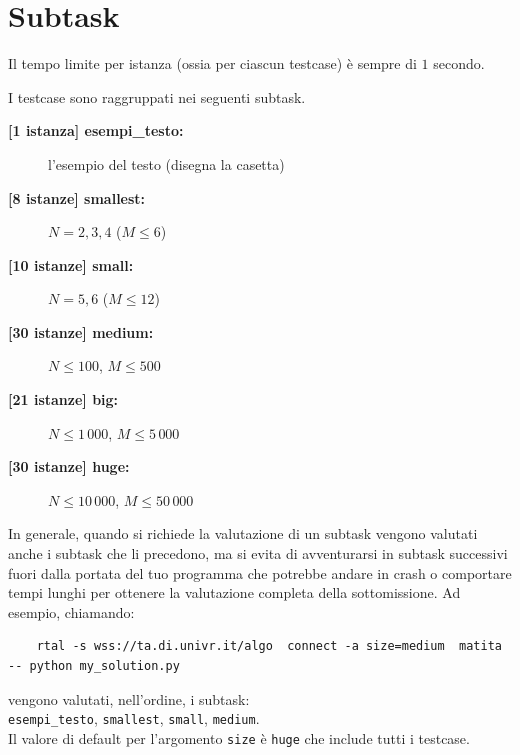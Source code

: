 \documentclass[a4paper,11pt]{article}
\begin{document}
\section*{Subtask}

Il tempo limite per istanza (ossia per ciascun testcase) è sempre di $1$ secondo.

I testcase sono raggruppati nei seguenti subtask.

\begin{description}
  \item[\textbf{\hspace{1ex}[1 istanza] esempi\_testo:}] l'esempio del testo (disegna la casetta)
  \item [\textbf{[8 istanze] smallest:}] $N = 2, 3, 4$ ($M \leq 6$)
  \item [\textbf{[10 istanze] small:}] $N = 5, 6$ ($M \leq 12$)
  \item [\textbf{[30 istanze] medium:}] $N \leq 100$, $M \leq 500$
  \item [\textbf{[21 istanze] big:}] $N \leq 1\,000$, $M \leq 5\,000$
  \item [\textbf{[30 istanze] huge:}] $N \leq 10\,000$, $M \leq 50\,000$
\end{description}

In generale, quando si richiede la valutazione di un subtask vengono valutati anche i subtask che li precedono, ma si evita di avventurarsi in subtask successivi  fuori dalla portata del tuo programma che potrebbe andare in crash o comportare tempi lunghi per ottenere la valutazione completa della sottomissione. Ad esempio, chiamando:

\begin{verbatim}
    rtal -s wss://ta.di.univr.it/algo  connect -a size=medium  matita -- python my_solution.py
\end{verbatim}

\noindent
vengono valutati, nell'ordine, i subtask:\\

{\tt esempi\_testo}, {\tt smallest}, {\tt small}, {\tt medium}.\\

\noindent
Il valore di default per l'argomento {\tt size} è {\tt huge} che include tutti i testcase.\\
\end{document}
